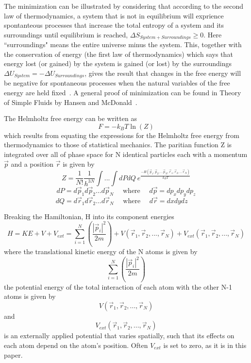 \documentclass[double,12pt]{beavtex}
\begin{document}
The minimization can be illustrated by considering that according to the 
second law of thermodynamics, a system that is not in equilibrium will 
exprience spontanteous processes that increase the total entropy of a 
system and its surroundings until equilibrium is reached, 
$\Delta{S}_{System + Surroundings} \geq 0$. Here ``surroundings" means 
the entire universe minus the system. This, together with the conservation 
of energy (the first law of thermodynamics) which says that energy lost 
(or gained) by the system is gained (or lost) by the surroundings 
$\Delta{U}_{System}=-\Delta{U}_{Surroundings}$, gives the result that 
changes in the free energy will be negative for spontaneous processes 
when the natural variables of the free energy are held fixed~\cite{schroeder}. 
A general proof of minimization 
can be found in Theory of Simple Fluids by Hansen and McDonald~\cite{Hansen}.

The Helmholtz free energy can be written as
\begin{equation}{F=-k_{B}T\ln(Z)}\end{equation}
which results from equating the expressions for the Helmholtz free energy 
from thermodynamics to those of statistical mechanics. The paritian function 
Z is integrated over all of phase space for N identical particles each with 
a momentum $\vec{p}$ and a position $\vec{r}$ is given by
\begin{equation}{Z=}\frac{1}{N!}\frac{1}{h^{3N}}\int{...}\int{dPdQ}~e^\frac{-H(\vec{p}_1,\vec{p}_2,...\vec{p}_N,\vec{r}_1, \vec{r}_2,...\vec{r}_N)}{k_BT}\end{equation}
\begin{displaymath}{dP=d\vec{p}_1d\vec{p}_2...d\vec{p}_N \mbox{~~~~where~~~~} d\vec{p}=dp_xdp_ydp_z}\end{displaymath}
\begin{displaymath}{dQ=d\vec{r}_1d\vec{r}_2...d\vec{r}_N \mbox{~~~~where~~~~} d\vec{r}=dxdydz\mbox{~~~~}}\end{displaymath}

Breaking the Hamiltonian, H into its component energies
\begin{equation}{H = KE + V + V_{ext} = \sum_{i=1}^N\left(\frac{|\vec{p}_i|^2}{2m}\right)+V(\vec{r}_1,\vec{r}_2,{...},\vec{r}_N)+V_{ext}(\vec{r}_1,\vec{r}_2,{...},\vec{r}_N)}\end{equation}
where the translational kinetic energy of the N atoms is given by 
\begin{displaymath}{\sum_{i=1}^N\left(\frac{|\vec{p}_i|^2}{2m}\right)}\end{displaymath}
the potential energy of the total interaction of each atom with the other 
N-1 atoms is given by
\begin{displaymath}{V(\vec{r}_1,\vec{r}_2,{...},\vec{r}_N)}\end{displaymath} 
and \begin{displaymath}{V_{ext}(\vec{r}_1,\vec{r}_2,{...},\vec{r}_N)}\end{displaymath} 
is an externally applied potential that varies spatially, such that its 
effects on each atom depend on the atom's position. Often $V_{ext}$ is 
set to zero, as it is in this paper. 
\end{document}
